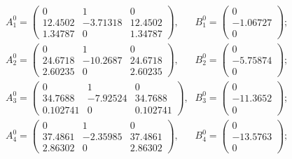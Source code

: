 \begin{equation*}
\begin{array}{lr}


A_1^0 = \left(\begin{array}{ccc}
0    &    1    &    0 \\
12.4502    &    -3.71318    &    12.4502 \\
1.34787    &    0    &    1.34787
\end{array}\right)\mbox{,} &
B_1^0 = \left(\begin{array}{c}
0 \\
-1.06727 \\
0
\end{array}\right)\mbox{;} \\

A_2^0 = \left(\begin{array}{ccc}
0    &    1    &    0 \\
24.6718    &    -10.2687    &    24.6718 \\
2.60235    &    0    &    2.60235
\end{array}\right)\mbox{,} &
B_2^0 = \left(\begin{array}{c}
0 \\
-5.75874 \\
0
\end{array}\right)\mbox{;} \\

A_3^0 = \left(\begin{array}{ccc}
0    &    1    &    0 \\
34.7688    &    -7.92524    &    34.7688 \\
0.102741    &    0    &    0.102741
\end{array}\right)\mbox{,} &
B_3^0 = \left(\begin{array}{c}
0 \\
-11.3652 \\
0
\end{array}\right)\mbox{;} \\

A_4^0 = \left(\begin{array}{ccc}
0    &    1    &    0 \\
37.4861    &    -2.35985    &    37.4861 \\
2.86302    &    0    &    2.86302
\end{array}\right)\mbox{,} &
B_4^0 = \left(\begin{array}{c}
0 \\
-13.5763 \\
0
\end{array}\right)\mbox{;} \\


\end{array}
\end{equation*}
